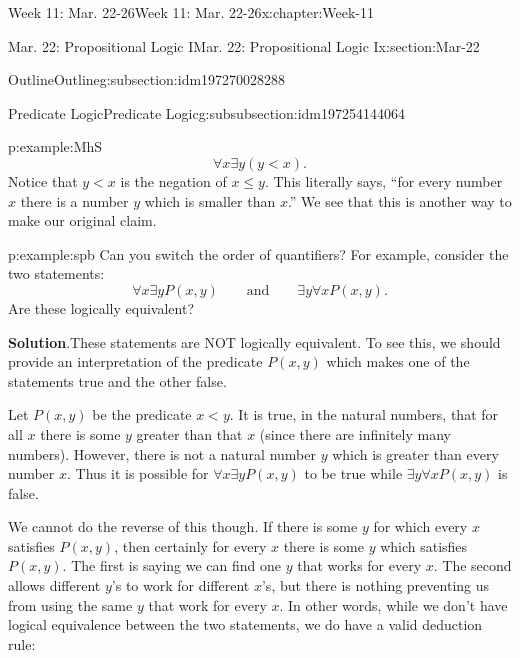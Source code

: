 \documentclass[oneside,10pt,]{book}
\newcommand{\blocktitlefont}{\relax}
\newcommand{\tabularfont}{\relax}
\numberwithin{equation}{section}
\newcommand{\hrulethin}  {\noalign{\hrule height 0.04em}}
\renewcommand{\le}{\leqslant}
\newcommand{\lt}{<}
\begin{document}
\begin{chapterptx}{Week 11: Mar. 22-26}{}{Week 11: Mar. 22-26}{}{}{x:chapter:Week-11}
\begin{sectionptx}{Mar. 22: Propositional Logic I}{}{Mar. 22: Propositional Logic I}{}{}{x:section:Mar-22}
\begin{subsectionptx}{Outline}{}{Outline}{}{}{g:subsection:idm197270028288}
\begin{subsubsectionptx}{Predicate Logic}{}{Predicate Logic}{}{}{g:subsubsection:idm197254144064}
\begin{example}{}{p:example:MhS}
\begin{equation*}
\forall x \exists y (y \lt x)\text{.}
\end{equation*}
Notice that \(y \lt x\) is the negation of \(x \le y\). This literally says, ``for every number \(x\) there is a number \(y\) which is smaller than \(x\).'' We see that this is another way to make our original claim.%
\end{example}
\begin{example}{}{p:example:spb}%
Can you switch the order of quantifiers? For example, consider the two statements:%
\begin{equation*}
\forall x \exists y P(x,y) \qquad \mathrm{ and } \qquad \exists y \forall x P(x,y)\text{.}
\end{equation*}
Are these logically equivalent?%
\par\smallskip%
\noindent\textbf{\blocktitlefont Solution}.\hypertarget{p:solution:hPW}{}\quad{}These statements are NOT logically equivalent. To see this, we should provide an interpretation of the predicate \(P(x,y)\) which makes one of the statements true and the other false.%
\par
Let \(P(x,y)\) be the predicate \(x \lt y\). It is true, in the natural numbers, that for all \(x\) there is some \(y\) greater than that \(x\) (since there are infinitely many numbers). However, there is not a natural number \(y\) which is greater than every number \(x\). Thus it is possible for \(\forall x \exists y P(x,y)\) to be true while \(\exists y \forall x P(x,y)\) is false.%
\par
We cannot do the reverse of this though. If there is some \(y\) for which every \(x\) satisfies \(P(x,y)\), then certainly for every \(x\) there is some \(y\) which satisfies \(P(x,y)\). The first is saying we can find one \(y\) that works for every \(x\). The second allows different \(y\)'s to work for different \(x\)'s, but there is nothing preventing us from using the same \(y\) that work for every \(x\). In other words, while we don't have logical equivalence between the two statements, we do have a valid deduction rule:%
\begin{sidebyside}{1}{0}{0}{0}%
\begin{sbspanel}{1}%
\resizebox{\linewidth}{!}{%
{\centering%
{\tabularfont%
\begin{tabular}{cc}
&\(\exists y \forall x P(x,y)\)\tabularnewline\hrulethin
\(\therefore\)&\(\forall x \exists y P(x,y)\)
\end{tabular}
}%
\par}
}
\end{sbspanel}
\end{sidebyside}
\end{example}
\end{subsubsectionptx}
\end{subsectionptx}
\end{sectionptx}
\end{chapterptx}
\end{document}
